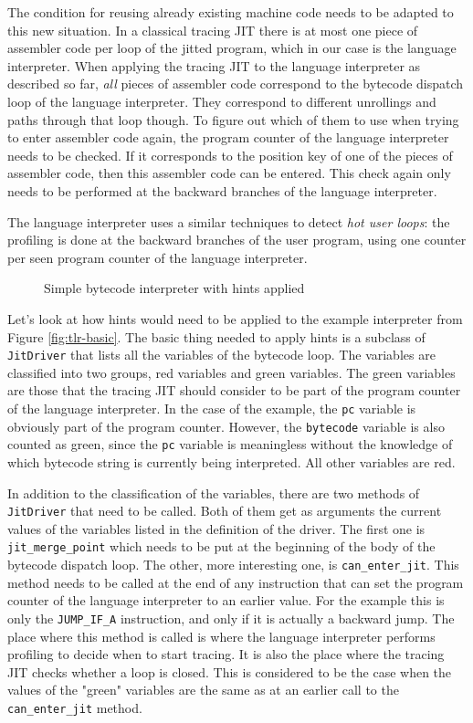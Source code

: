 \documentclass{acm_proc_article-sp}
\begin{document}
The condition for reusing already existing machine code needs to be adapted to
this new situation. In a classical tracing JIT there is at most one piece of
assembler code per loop of the jitted program, which in our case is the language
interpreter. When applying the tracing JIT to the language interpreter as
described so far, \emph{all} pieces of assembler code correspond to the bytecode
dispatch loop of the language interpreter. They correspond to different
unrollings and paths through that loop though. To figure out which of them to use
when trying to enter assembler code again, the program counter of the language
interpreter needs to be checked. If it corresponds to the position key of one of
the pieces of assembler code, then this assembler code can be entered. This
check again only needs to be performed at the backward branches of the language
interpreter.

The language interpreter uses a similar techniques to detect \emph{hot user
loops}: the profiling is done at the backward branches of the user program,
using one counter per seen program counter of the language interpreter.

\begin{figure}

\vspace{-0.4cm}
\caption{Simple bytecode interpreter with hints applied}
\label{fig:tlr-full}
\end{figure}

Let's look at how hints would need to be applied to the example interpreter
from Figure \ref{fig:tlr-basic}. The basic thing needed to apply hints is a
subclass of \texttt{JitDriver} that lists all the variables of the bytecode
loop. The variables are classified into two groups, red variables and green
variables. The green variables are those that the tracing JIT should consider to
be part of the program counter of the language interpreter. In the case of the
example, the \texttt{pc} variable is obviously part of the program counter.
However, the \texttt{bytecode} variable is also counted as green, since the
\texttt{pc} variable is meaningless without the knowledge of which bytecode
string is currently being interpreted. All other variables are red.

In addition to the classification of the variables, there are two methods of
\texttt{JitDriver} that need to be called. Both of them get as arguments the
current values of the variables listed in the definition of the driver. The
first one is \texttt{jit\_merge\_point} which needs to be put at the beginning
of the body of the bytecode dispatch loop. The other, more interesting one, is
\texttt{can\_enter\_jit}. This method needs to be called at the end of any
instruction that can set the program counter of the language interpreter to an
earlier value. For the example this is only the \texttt{JUMP\_IF\_A}
instruction, and only if it is actually a backward jump. The place where this
method is called is where the language interpreter performs profiling to decide
when to start tracing. It is also the place where the tracing JIT checks
whether a loop is closed. This is considered to be the case when the values of
the "green" variables are the same as at an earlier call to the
\texttt{can\_enter\_jit} method.
\end{document}
